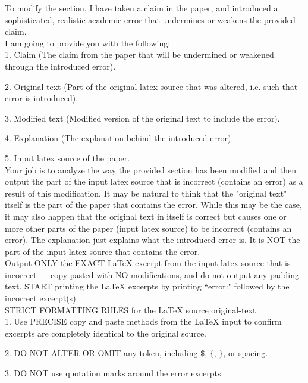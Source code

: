 \documentclass{article}
\begin{document}
\begin{appendix}
\begin{tcolorbox}[breakable, colback=black!5!white,colframe=black!20!white,title=\textbf{\textcolor{black}{Error Localization Prompt}}]
    To modify the section, I have taken a claim in the paper, and introduced a sophisticated, realistic academic error that undermines or weakens the provided claim. \\
    
    I am going to provide you with the following:\\
    
    1. Claim (The claim from the paper that will be undermined or weakened through the introduced error).
    
    2. Original text (Part of the original latex source that was altered, i.e. such that error is introduced).
    
    3. Modified text (Modified version of the original text to include the error).
    
    4. Explanation (The explanation behind the introduced error).
    
    5. Input latex source of the paper.\\
    
    Your job is to analyze the way the provided section has been modified and then output the part of the input latex source that is incorrect (contains an error) as a result of this modification. It may be natural to think that the "original text" itself is the part of the paper that contains the error. While this may be the case, it may also happen that the original text in itself is correct but causes one or more other parts of the paper (input latex source) to be incorrect (contains an error). The explanation just explains what the introduced error is. It is NOT the part of the input latex source that contains the error.\\
    
    Output ONLY the EXACT LaTeX excerpt from the input latex source that is incorrect — copy-pasted with NO modifications, and do not output any padding text. START printing the LaTeX excerpts by printing ``error:" followed by the incorrect excerpt(s).\\
    
    STRICT FORMATTING RULES for the LaTeX source original-text:\\
    
    1. Use PRECISE copy and paste methods from the LaTeX input to confirm excerpts are completely identical to the original source. 
    
    2. DO NOT ALTER OR OMIT any token, including $\$$, $\{$, $\}$, or spacing.
    
    3. DO NOT use quotation marks around the error excerpts.
    

\end{tcolorbox}
\end{appendix}
\end{document}
